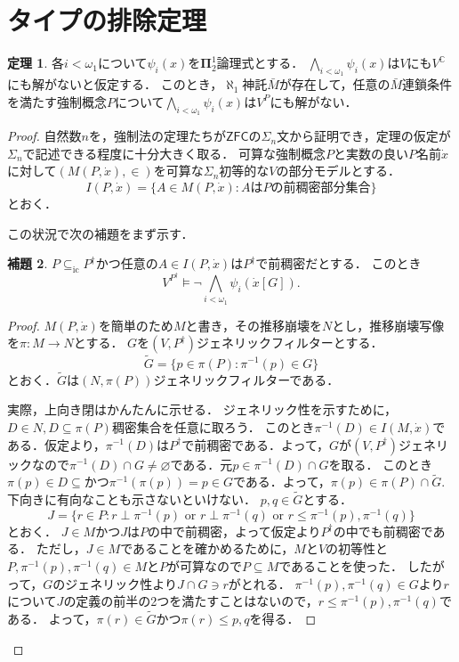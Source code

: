 \documentclass[uplatex]{jsarticle}
\newcommand{\C}{\mathbb{C}}
\newcommand{\boldpi}{\boldsymbol{\Pi}}
\newcommand{\ZFC}{\mathsf{ZFC}}
\newcommand{\subsetic}{\subseteq_{\mathrm{ic}}}
\renewcommand\emptyset{\varnothing}
\renewcommand\subset{\subseteq}
\theoremstyle{definition}
\newtheorem{thm}{定理}[section]
\newtheorem{lem}[thm]{補題}
\begin{document}
	\section{タイプの排除定理}
	
	\begin{thm}
		各$i < \omega_1$について$\psi_i(x)$を$\boldpi^1_2$論理式とする．
		$\bigwedge_{i < \omega_1} \psi_i(x)$は$V$にも$V^\C$にも解がないと仮定する．
		このとき，$\aleph_1$神託$\bar{M}$が存在して，任意の$\bar{M}$連鎖条件を満たす強制概念$P$について$\bigwedge_{i < \omega_1} \psi_i(x)$は$V^P$にも解がない．
	\end{thm}
	\begin{proof}
		自然数$n$を，強制法の定理たちが$\ZFC$の$\Sigma_n$文から証明でき，定理の仮定が$\Sigma_n$で記述できる程度に十分大きく取る．
		可算な強制概念$P$と実数の良い$P$名前$\dot{x}$に対して$(M(P, \dot{x}), \in)$を可算な$\Sigma_n$初等的な$V$の部分モデルとする．	
		\[
		I(P, \dot{x}) = \{ A \in M(P, \dot{x}) : \text{$A$は$P$の前稠密部分集合}  \}
		\]
		とおく．
		
		この状況で次の補題をまず示す．
		
		\begin{lem}
			$P \subsetic P^\dagger$かつ任意の$A \in I(P, \dot{x})$は$P^\dagger$で前稠密だとする．
			このとき
			\[
				V^{P^\dagger} \models \neg \bigwedge_{i < \omega_1} \psi_i(\dot{x}[G]).
			\]
		\end{lem}
		\renewcommand\qedsymbol{//}
		\begin{proof}
			$M(P, \dot{x})$を簡単のため$M$と書き，その推移崩壊を$N$とし，推移崩壊写像を$\pi \colon M \to N$とする．
			$G$を$(V, P^\dagger)$ジェネリックフィルターとする．
			\[
			\tilde{G} = \{ p \in \pi(P) : \pi^{-1}(p) \in G \}
			\]
			とおく．$\tilde{G}$は$(N, \pi(P))$ジェネリックフィルターである．
			
			実際，上向き閉はかんたんに示せる．
			ジェネリック性を示すために，$D \in N, D \subset \pi(P)$稠密集合を任意に取ろう．
			このとき$\pi^{-1}(D) \in I(M, \dot{x})$である．仮定より，$\pi^{-1}(D)$は$P^\dagger$で前稠密である．よって，$G$が$(V, P^\dagger)$ジェネリックなので$\pi^{-1}(D) \cap G \ne \emptyset$である．元$p \in \pi^{-1}(D) \cap G$を取る．
			このとき$\pi(p) \in D \subset$かつ$\pi^{-1}(\pi(p)) = p \in G$である．よって，$\pi(p) \in \pi(P) \cap \tilde{G}$.
			下向きに有向なことも示さないといけない．
			$p, q \in \tilde{G}$とする．
			\[ J = \{ r \in P : r \perp \pi^{-1}(p) \text{ or } r \perp \pi^{-1}(q) \text{ or } r \le \pi^{-1}(p), \pi^{-1}(q) \} \]
			とおく．
			$J \in M$かつ$J$は$P$の中で前稠密，よって仮定より$P^\dagger$の中でも前稠密である．
			ただし，$J \in M$であることを確かめるために，$M$と$V$の初等性と$P, \pi^{-1}(p), \pi^{-1}(q) \in M$と$P$が可算なので$P \subset M$であることを使った．
			したがって，$G$のジェネリック性より$J \cap G \ni r$がとれる．
			$\pi^{-1}(p), \pi^{-1}(q) \in G$より$r$について$J$の定義の前半の2つを満たすことはないので，$r \le \pi^{-1}(p), \pi^{-1}(q)$である．
			よって，$\pi(r) \in \tilde{G}$かつ$\pi(r) \le p, q$を得る．
			

\end{proof}
\end{proof}
\end{document}
